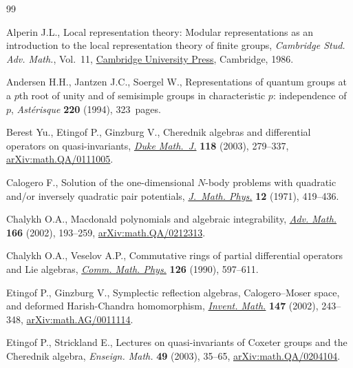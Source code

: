 \documentclass[pdftex]{sigma}
\theoremstyle{definition}
\numberwithin{equation}{section}
\begin{document}
\begin{thebibliography}{99}
\footnotesize\itemsep=0pt

Alperin J.L., Local representation theory: {M}odular representations as an
 introduction to the local representation theory of finite groups,
 \textit{Cambridge Stud. Adv. Math.}, Vol.~11,
 \href{https://doi.org/10.1017/CBO9780511623592}{Cambridge University Press},
 Cambridge, 1986.

Andersen H.H., Jantzen J.C., Soergel W., Representations of quantum groups at a
 {$p$}th root of unity and of semisimple groups in characteristic {$p$}:
 independence of {$p$}, \textit{Ast\'erisque} \textbf{220} (1994), 323~pages.

Berest Yu., Etingof P., Ginzburg V., Cherednik algebras and differential
 operators on quasi-invariants,
 \href{https://doi.org/10.1215/S0012-7094-03-11824-4}{\textit{Duke Math.~J.}}
 \textbf{118} (2003), 279--337,
 \href{http://arxiv.org/abs/math.QA/0111005}{arXiv:math.QA/0111005}.

Calogero F., Solution of the one-dimensional {$N$}-body problems with quadratic
 and/or inversely quadratic pair potentials,
 \href{https://doi.org/10.1063/1.1665604}{\textit{J.~Math. Phys.}} \textbf{12}
 (1971), 419--436.

Chalykh O.A., Macdonald polynomials and algebraic integrability,
 \href{https://doi.org/10.1006/aima.2001.2033}{\textit{Adv. Math.}}
 \textbf{166} (2002), 193--259,
 \href{http://arxiv.org/abs/math.QA/0212313}{arXiv:math.QA/0212313}.

Chalykh O.A., Veselov A.P., Commutative rings of partial differential operators
 and {L}ie algebras, \href{https://doi.org/10.1007/BF02125702}{\textit{Comm.
 Math. Phys.}} \textbf{126} (1990), 597--611.

Etingof P., Ginzburg V., Symplectic reflection algebras, {C}alogero--{M}oser
 space, and deformed {H}arish-{C}handra homomorphism,
 \href{https://doi.org/10.1007/s002220100171}{\textit{Invent. Math.}}
 \textbf{147} (2002), 243--348,
 \href{http://arxiv.org/abs/math.AG/0011114}{arXiv:math.AG/0011114}.

Etingof P., Strickland E., Lectures on quasi-invariants of {C}oxeter groups and
 the {C}herednik algebra, \textit{Enseign. Math.} \textbf{49} (2003), 35--65,
 \href{http://arxiv.org/abs/math.QA/0204104}{arXiv:math.QA/0204104}.


\end{thebibliography}
\end{document}
